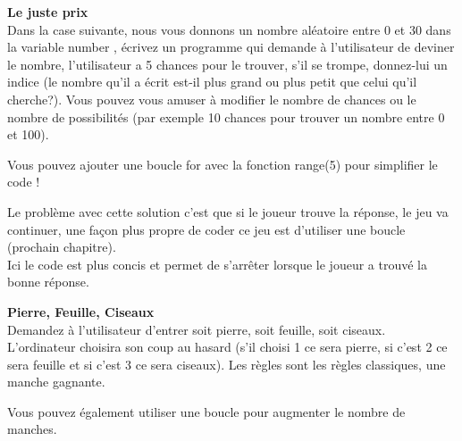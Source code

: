 \begin{Exercice}[20 minutes] \textbf{Le juste prix}\\
  Dans la case suivante, nous vous donnons un nombre aléatoire entre 0 et 30 dans la variable number , écrivez un programme qui demande à l'utilisateur de deviner le nombre, l'utilisateur a 5 chances pour le trouver, s'il se trompe, donnez-lui un indice (le nombre qu'il a écrit est-il plus grand ou plus petit que celui qu'il cherche?). Vous pouvez vous amuser à modifier le nombre de chances ou le nombre de possibilités (par exemple 10 chances pour trouver un nombre entre 0 et 100).   \\
  
  
  
  
   
    \begin{conseil}
      	Vous pouvez ajouter une boucle for avec la fonction range(5) pour simplifier le code !
        
    \end{conseil}
    \begin{solution}
    
   
   
   Le problème avec cette solution c'est que si le joueur trouve la réponse, le jeu va continuer, une façon plus propre de coder ce jeu est d'utiliser une boucle (prochain chapitre). \\
   
   
   
  	Ici le code est plus concis et permet de s'arrêter lorsque le joueur a trouvé la bonne réponse.\\
           
    \end{solution}   
\end{Exercice}

\newpage
\begin{Exercice}[20 minutes] \textbf{Pierre, Feuille, Ciseaux}\\
  Demandez à l'utilisateur d'entrer soit pierre, soit feuille, soit ciseaux. L'ordinateur choisira son coup au hasard (s'il choisi 1 ce sera pierre, si c'est 2 ce sera feuille et si c'est 3 ce sera ciseaux). Les règles sont les règles classiques, une manche gagnante.   \\
  
  
   
    \begin{solution}
    
    
    
    Vous pouvez également utiliser une boucle pour augmenter le nombre de manches. \\
           
    \end{solution}   
\end{Exercice}



